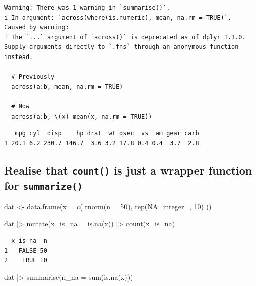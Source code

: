 \documentclass[
  letterpaper,
  DIV=11,
  numbers=noendperiod]{scrreprt}
\newenvironment{Shaded}{\begin{snugshade}}{\end{snugshade}}
\newcommand{\AttributeTok}[1]{\textcolor[rgb]{0.40,0.45,0.13}{#1}}
\newcommand{\ConstantTok}[1]{\textcolor[rgb]{0.56,0.35,0.01}{#1}}
\newcommand{\DecValTok}[1]{\textcolor[rgb]{0.68,0.00,0.00}{#1}}
\newcommand{\FunctionTok}[1]{\textcolor[rgb]{0.28,0.35,0.67}{#1}}
\newcommand{\NormalTok}[1]{\textcolor[rgb]{0.00,0.23,0.31}{#1}}
\newcommand{\OtherTok}[1]{\textcolor[rgb]{0.00,0.23,0.31}{#1}}
\newcommand{\SpecialCharTok}[1]{\textcolor[rgb]{0.37,0.37,0.37}{#1}}
\begin{document}
\begin{verbatim}
Warning: There was 1 warning in `summarise()`.
i In argument: `across(where(is.numeric), mean, na.rm = TRUE)`.
Caused by warning:
! The `...` argument of `across()` is deprecated as of dplyr 1.1.0.
Supply arguments directly to `.fns` through an anonymous function instead.

  # Previously
  across(a:b, mean, na.rm = TRUE)

  # Now
  across(a:b, \(x) mean(x, na.rm = TRUE))
\end{verbatim}

\begin{verbatim}
   mpg cyl  disp    hp drat  wt qsec  vs  am gear carb
1 20.1 6.2 230.7 146.7  3.6 3.2 17.8 0.4 0.4  3.7  2.8
\end{verbatim}

\subsection{\texorpdfstring{Realise that \texttt{count()} is just a
wrapper function for
\texttt{summarize()}}{Realise that count() is just a wrapper function for summarize()}}\label{realise-that-count-is-just-a-wrapper-function-for-summarize}

\begin{Shaded}
\begin{Highlighting}[]
\NormalTok{dat }\OtherTok{\textless{}{-}} \FunctionTok{data.frame}\NormalTok{(}\AttributeTok{x =} \FunctionTok{c}\NormalTok{(}
  \FunctionTok{rnorm}\NormalTok{(}\AttributeTok{n =} \DecValTok{50}\NormalTok{),}
  \FunctionTok{rep}\NormalTok{(}\ConstantTok{NA\_integer\_}\NormalTok{, }\DecValTok{10}\NormalTok{)}
\NormalTok{))}

\NormalTok{dat }\SpecialCharTok{|\textgreater{}}
  \FunctionTok{mutate}\NormalTok{(}\AttributeTok{x\_is\_na =} \FunctionTok{is.na}\NormalTok{(x)) }\SpecialCharTok{|\textgreater{}}
  \FunctionTok{count}\NormalTok{(x\_is\_na)}
\end{Highlighting}
\end{Shaded}

\begin{verbatim}
  x_is_na  n
1   FALSE 50
2    TRUE 10
\end{verbatim}

\begin{Shaded}
\begin{Highlighting}[]
\NormalTok{dat }\SpecialCharTok{|\textgreater{}}
  \FunctionTok{summarise}\NormalTok{(}\AttributeTok{n\_na =} \FunctionTok{sum}\NormalTok{(}\FunctionTok{is.na}\NormalTok{(x)))}
\end{Highlighting}
\end{Shaded}
\end{document}
